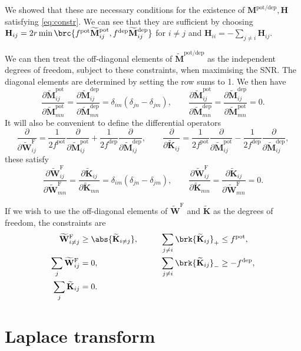 \documentclass[12pt]{article}
\newcommand{\W}{\mathbf{W}}
\newcommand{\M}{\mathbf{M}}
\newcommand{\enc}{\mathbf{K}}
\newcommand{\pot}{^{\text{pot}}}
\newcommand{\dep}{^{\text{dep}}}
\newcommand{\potdep}{^{\text{pot/dep}}}
\renewcommand{\hom}{\mathbf{H}}
\newcommand{\Mh}{\widetilde{\M}}
\newcommand{\frgh}{\widetilde{\W}^{\mathrm{F}}}
\newcommand{\ench}{\widetilde{\enc}}
\renewcommand{\pdiff}[2]{\frac{\partial #1}{\partial #2}}
\begin{document}
We showed that these are necessary conditions for the existence of $\M\potdep,\hom$ satisfying \eqref{eq:constr}.
We can see that they are sufficient by choosing $\hom_{ij} = 2r\min\brc{f\pot\Mh\pot_{ij},f\dep\Mh\dep_{ij}}$ for $i \neq j$ and $\hom_{ii}=-\sum_{j \neq i} \hom_{ij}$.

We can then treat the off-diagonal elements of $\Mh\potdep$ as the independent degrees of freedom, subject to these constraints, when maximising the SNR.
The diagonal elements are determined by setting the row sums to 1.
We then have
%
\begin{equation}\label{eq:derivpd}
  \pdiff{\Mh\pot_{ij}}{\Mh\pot_{mn}} = \pdiff{\Mh\dep_{ij}}{\Mh\dep_{mn}} = \delta_{im}(\delta_{jn}-\delta_{jm}),
  \qquad
  \pdiff{\Mh\pot_{ij}}{\Mh\dep_{mn}} = \pdiff{\Mh\dep_{ij}}{\Mh\pot_{mn}} = 0.
\end{equation}
%
It will also be convenient to define the differential operators
%
\begin{equation}\label{eq:pertfe}
  \pdiff{}{\frgh_{ij}} = \frac{1}{2f\pot} \pdiff{}{\Mh\pot_{ij}} + \frac{1}{2f\dep} \pdiff{}{\Mh\dep_{ij}},
  \qquad
  \pdiff{}{\ench_{ij}} = \frac{1}{2f\pot} \pdiff{}{\Mh\pot_{ij}} - \frac{1}{2f\dep} \pdiff{}{\Mh\dep_{ij}},
\end{equation}
%
these satisfy
%
\begin{equation}\label{eq:derivfe}
  \pdiff{\frgh_{ij}}{\frgh_{mn}} = \pdiff{\ench_{ij}}{\ench_{mn}} = \delta_{im}(\delta_{jn}-\delta_{jm}),
  \qquad
  \pdiff{\frgh_{ij}}{\ench_{mn}} = \pdiff{\ench_{ij}}{\frgh_{mn}} = 0.
\end{equation}
%

If we wish to use the off-diagonal elements of $\frgh$ and $\ench$ as the degrees of freedom, the constraints are
%
\begin{equation}\label{eq:constrfe}
\begin{aligned}
  \frgh_{i \neq j}   &\geq \abs{ \ench_{i \neq j} }, &\qquad
  \sum_{j\neq i} \brk{ \ench_{ij} }_+ &\leq f\pot, \\
  \sum_j \frgh_{ij} &=0, &
  \sum_{j\neq i} \brk{ \ench_{ij} }_- &\geq -f\dep, \\
  \sum_j \ench_{ij} &=0.
\end{aligned}
\end{equation}
%




\section{Laplace transform}\label{sec:laplace}
\end{document}
